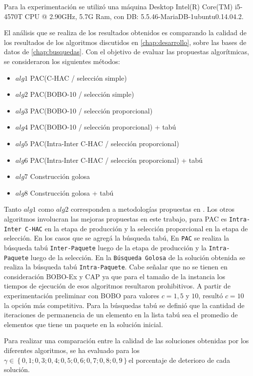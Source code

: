 Para la experimentación se utilizó una máquina Desktop Intel(R) Core(TM) i5-4570T CPU @ 2.90GHz, 5.7G Ram, con DB: 5.5.46-MariaDB-1ubuntu0.14.04.2.

El análisis que se realiza de los resultados obtenidos es comparando la calidad de los resultados de los algoritmos discutidos en \autoref{chap:desarrollo}, sobre las bases de datos de \autoref{chap:busquedas}. Con el objetivo de evaluar las propuestas algorítmicas, se consideraron los siguientes métodos:

\begin{itemize}
\item{$alg1$} PAC(C-HAC / selección simple)
\item{$alg2$} PAC(BOBO-10 / selección simple)
\item{$alg3$} PAC(BOBO-10 / selección proporcional)
\item{$alg4$} PAC(BOBO-10 / selección proporcional) + tabú
\item{$alg5$} PAC(Intra-Inter C-HAC / selección proporcional)
\item{$alg6$} PAC(Intra-Inter C-HAC / selección proporcional) + tabú
\item{$alg7$} Construcción golosa
\item{$alg8$} Construcción golosa + tabú
\end{itemize}

Tanto $alg1$ como $alg2$ corresponden a metodologías propuestas en \cite{compositeRetrival}. Los otros algoritmos involucran las mejoras propuestas en este trabajo, para PAC es \texttt{Intra-Inter C-HAC} en la etapa de producción y la selección proporcional en la etapa de selección. En los casos que se agregá la búsqueda tabú, En \texttt{PAC} se realiza la búsqueda tabú \texttt{Inter-Paquete} luego de la etapa de producción y la \texttt{Intra-Paquete} luego de la selección. En la \texttt{Búsqueda Golosa} de la solución obtenida se realiza la búsqueda tabú \texttt{Intra-Paquete}. Cabe señalar que no se tienen en consideración BOBO-Ex y CAP ya que para el tamaño de la instancia los tiempos de ejecución de esos algoritmos resultaron prohibitivos. A partir de experimentación preliminar con BOBO para valores $c=1, 5$ y $10$, resultó $c=10$ la opción más competitiva. Para la búsquedas tabú se definió que la cantidad de iteraciones de permanencia de un elemento en la lista tabú sea el promedio de elementos que tiene un paquete en la solución inicial.

Para realizar una comparación entre la calidad de las soluciones obtenidas por los diferentes algoritmos, se ha evaluado para los $\gamma \in \left\{0,1; 0,3; 0,4; 0,5; 0,6; 0,7; 0,8; 0,9\right\} $el porcentaje de deterioro de cada solución.

